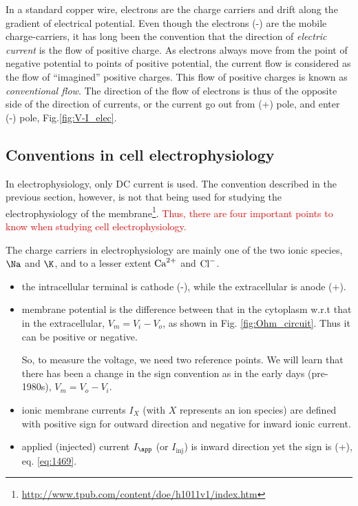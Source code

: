 In a standard copper wire, electrons are the charge carriers and drift along the
gradient of electrical potential. Even though the electrons (-) are the mobile
charge-carriers, it has long been the convention that the direction of {\it
electric current} is the flow of positive charge. As electrons always move from
the point of negative potential to points of positive potential, the current
flow is considered as the flow of ``imagined'' positive charges.  This flow of
positive charges is known as {\it conventional flow}. The direction of the flow
of electrons is thus of the opposite side of the direction of currents, or the
current go out from (+) pole, and enter (-) pole, Fig.\ref{fig:V-I_elec}.

\subsection{Conventions in cell electrophysiology}
\label{sec:conv-cell-phys}

In electrophysiology, only DC current is used. The convention described in the
previous section, however, is not that being used for studying the  electrophysiology of
the membrane\footnote{\url{http://www.tpub.com/content/doe/h1011v1/index.htm}}.
\textcolor{red}{Thus, there are four important points to know when
  studying cell electrophysiology.}

The charge carriers in electrophysiology are mainly one of the two ionic
species, $\Na$ and $\K$, and to a lesser extent ${\text{Ca}^{2+}}$ and ${\text{Cl}^{-}}$.

\begin{itemize}
\item the intracellular terminal is cathode (-), while the
  extracellular is anode (+).

\item membrane potential is the difference between that in the
  cytoplasm w.r.t that in the extracellular, $V_m=V_i-V_o$, as shown
  in Fig. \ref{fig:Ohm_circuit}. Thus it can be positive or negative. 

So, to measure the voltage, we need two reference points. We will learn that
there has been a change in the sign convention as in the early days (pre-1980s),
$V_m=V_o-V_i$.

\item ionic membrane currents $I_X$ (with $X$ represents an ion species) are
defined with positive sign for outward direction and negative for inward ionic
current.
  
\item applied (injected) current $I_\app$ (or $I_\text{inj}$) is inward
direction yet the sign is (+), eq.
\ref{eq:1469}.
\end{itemize}

